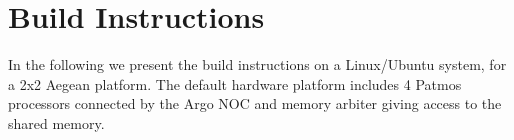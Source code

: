 \documentclass[a4paper,fontsize=10pt,twoside,DIV15,BCOR12mm,headinclude=true,footinclude=false,pagesize,bibtotoc]{scrbook}
\begin{document}
%
%
%
%


\section{Build Instructions}

In the following we present the build instructions on a Linux/Ubuntu system,
for a 2x2 Aegean platform. The default hardware platform includes 4 Patmos processors 
connected by the Argo NOC and memory arbiter giving access to the shared memory.
\end{document}
